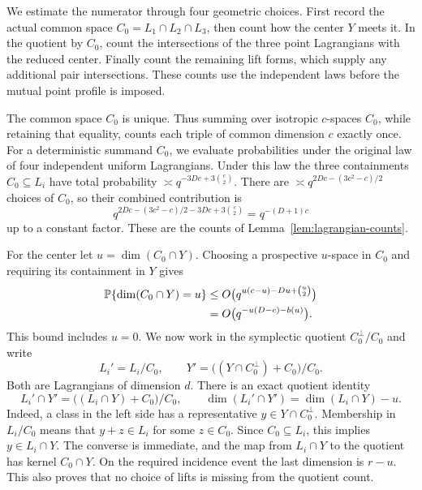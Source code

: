 We estimate the numerator through four geometric choices. First record
the actual common space \(C_0=L_1\cap L_2\cap L_3\), then count how
the center \(Y\) meets it. In the quotient by \(C_0\), count the
intersections of the three point Lagrangians with the reduced center.
Finally count the remaining lift forms, which supply any additional
pair intersections. These counts use the independent laws before the
mutual point profile is imposed.

The common space \(C_0\) is unique. Thus summing over
isotropic $c$-spaces $C_0$, while retaining that equality, counts each
triple of common dimension $c$ exactly once.  For a deterministic
summand $C_0$, we evaluate probabilities under the original law of
four independent uniform Lagrangians.  Under this law the
three containments $C_0\subseteq L_i$ have total probability
$\asymp q^{-3Dc+3\binom c2}$.  There are
$\asymp q^{2Dc-(3c^2-c)/2}$ choices of $C_0$, so their combined
contribution is
\begin{equation}\label{eq:planted-common-count}
 q^{2Dc-(3c^2-c)/2-3Dc+3\binom c2}
      =q^{-(D+1)c}
\end{equation}
up to a constant factor.  These are the counts of
Lemma~\ref{lem:lagrangian-counts}.

For the center let $u=\dim(C_0\cap Y)$.  Choosing a prospective
$u$-space in $C_0$ and requiring its containment in $Y$ gives
\begin{align}
 \P\{\dim(C_0\cap Y)=u\}
 &\le O\bigl(q^{u(c-u)-Du+\binom u2}\bigr) \notag\\
 &=O\bigl(q^{-u(D-c)-b(u)}\bigr).
 \label{eq:planted-center-common-cost}
\end{align}
This bound includes $u=0$.  We now work in the symplectic quotient
$C_0^\perp/C_0$ and write
\[
 L_i'=L_i/C_0,\qquad
 Y'=\bigl((Y\cap C_0^\perp)+C_0\bigr)/C_0.
\]
Both are Lagrangians of dimension $d$.  There is an exact quotient
identity
\begin{equation}\label{eq:planted-quotient-intersection}
 L_i'\cap Y'=\bigl((L_i\cap Y)+C_0\bigr)/C_0,
 \qquad \dim(L_i'\cap Y')=\dim(L_i\cap Y)-u.
\end{equation}
Indeed, a class in the left side has a representative
$y\in Y\cap C_0^\perp$.  Membership in $L_i/C_0$ means that
$y+z\in L_i$ for some $z\in C_0$.  Since $C_0\subseteq L_i$,
this implies $y\in L_i\cap Y$.  The converse is immediate, and the
map from $L_i\cap Y$ to the quotient has kernel $C_0\cap Y$.
On the required incidence event the last dimension is $r-u$.
This also proves that no choice of lifts is missing from the quotient
count.

